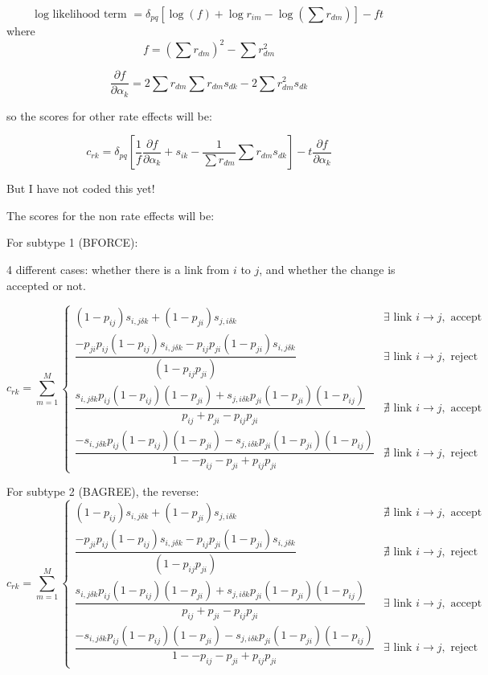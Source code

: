 \documentclass[12pt,a4paper]{article}
\renewcommand{\=}{\,=\,}
\newcommand{\+}{\,+\,}
\begin{document}
$$
    \text{log likelihood term } = \delta_{pq} \left [\log(f) + \log r_{im} 
    - \log(\sum r_{dm})\right ] -ft
$$
where
$$f=(\sum r_{dm})^2 - \sum r_{dm}^2$$

$$\frac{\partial f}{\partial \alpha_k} = 
2 \sum r_{dm} \sum r_{dm} s_{dk} - 2 \sum r_{dm}^2 s_{dk}
$$

so the scores for other rate effects will be:

$$
c_{rk} = \delta_{pq}\left [ \dfrac{1}{f} \frac{\partial f}{\partial \alpha_k}  + s_{ik}
- \dfrac{1}{\sum r_{dm}}\sum
r_{dm} s_{dk} \right ]- 
t\frac{\partial f}{\partial \alpha_k}
$$

But I have not coded this yet!

The scores for the non rate effects will be: 

For subtype 1 (BFORCE):

4 different cases: whether there is a link from $i$ to $j$, and whether the
change is accepted or not.

$$
c_{rk}= \sum_{m=1}^M \begin{cases}
 (1-p_{ij})s_{i,j\delta k} + (1-p_{ji}) s_{j,i\delta k} 
& \exists \text{ link }  i \rightarrow j, \text{ accept}\\
\dfrac{
 -p_{ji} p_{ij} (1-p_{ij}) s_{i, j\delta k} - p_{ij} p_{ji} (1-p_{ji}) 
s_{i, j\delta k}}{(1 - p_{ij} p_{ji})} & \exists \text{ link } 
i \rightarrow j, \text{ reject}\\
\dfrac{s_{i, j\delta k} p_{ij} (1 - p_{ij}) (1-p_{ji}) +
 s_{j, i\delta k} p_{ji} (1 - p_{ji}) (1-p_{ij}) }
{p_{ij} + p_{ji} - p_{ij}p_{ji}}& \nexists \text{ link } i \rightarrow j,
\text{ accept}\\
\dfrac{-s_{i, j\delta k} p_{ij}(1-p_{ij})(1-p_{ji}) -
s_{j, i\delta k} p_{ji}(1-p_{ji})(1-p_{ij})}
{1 -- p_{ij} - p_{ji} + p_{ij}p_{ji}} &\nexists \text{ link } i \rightarrow j,
\text{ reject}
\end{cases}
$$

For subtype 2 (BAGREE), the reverse:
$$c_{rk}= \sum_{m=1}^M \begin{cases}
 (1-p_{ij})s_{i,j\delta k} + (1-p_{ji}) s_{j,i\delta k} 
& \nexists \text{ link }  i \rightarrow j, \text{ accept}\\
\dfrac{
 -p_{ji} p_{ij} (1-p_{ij}) s_{i, j\delta k} - p_{ij} p_{ji} (1-p_{ji}) 
s_{i, j\delta k}}{(1 - p_{ij} p_{ji})} & \nexists \text{ link } 
i \rightarrow j, \text{ reject}\\
\dfrac{s_{i, j\delta k} p_{ij} (1 - p_{ij}) (1-p_{ji}) +
 s_{j, i\delta k} p_{ji} (1 - p_{ji}) (1-p_{ij}) }
{p_{ij} + p_{ji} - p_{ij}p_{ji}}& \exists \text{ link } i \rightarrow j,
\text{ accept}\\
\dfrac{-s_{i, j\delta k} p_{ij}(1-p_{ij})(1-p_{ji}) -
s_{j, i\delta k} p_{ji}(1-p_{ji})(1-p_{ij})}
{1 -- p_{ij} - p_{ji} + p_{ij}p_{ji}} &\exists \text{ link } i \rightarrow j,
\text{ reject}
\end{cases}
$$
\end{document}

